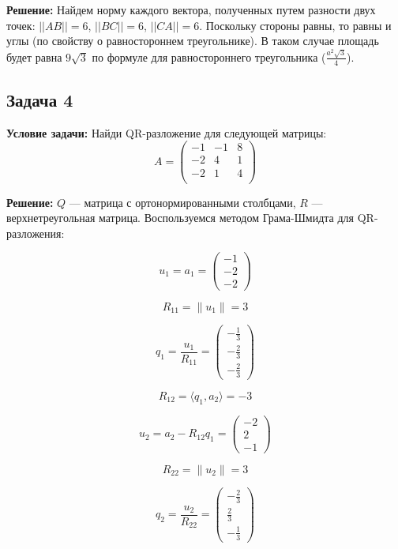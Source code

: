 \documentclass[a4paper,12pt]{article}
\begin{document}
\textbf{Решение:}
Найдем норму каждого вектора, полученных путем разности двух точек: $||AB|| = 6$, $||BC|| = 6$, $||CA|| = 6$. Поскольку стороны равны, то равны и углы (по свойству о равностороннем треугольнике). В таком случае площадь будет равна $9\sqrt{3}$ по формуле для равностороннего треугольника ($\frac{a^2\sqrt{3}}{4}$).

\vspace{1cm}

\subsection{Задача 4}
\textbf{Условие задачи:} Найди QR-разложение для следующей матрицы:
\[
A = \begin{pmatrix}
-1 & -1 & 8 \\
-2 & 4 & 1 \\
-2 & 1 & 4 \\
\end{pmatrix}
\]

\textbf{Решение:}
$Q$ — матрица с ортонормированными столбцами, $R$ — верхнетреугольная матрица. Воспользуемся методом Грама-Шмидта для QR-разложения:

\[
u_1 = a_1 = \begin{pmatrix}
-1 \\ -2 \\ -2
\end{pmatrix}
\]

\[
R_{11} = \|u_1\| = 3
\]

\[
q_1 = \frac{u_1}{R_{11}} = \begin{pmatrix}
-\frac{1}{3} \\
-\frac{2}{3} \\
-\frac{2}{3}
\end{pmatrix}
\]

\[
R_{12} = \langle q_1, a_2 \rangle = -3
\]

\[
u_2 = a_2 - R_{12} q_1 = \begin{pmatrix}
-2 \\ 2 \\ -1
\end{pmatrix}
\]

\[
R_{22} = \|u_2\| = 3
\]

\[
q_2 = \frac{u_2}{R_{22}} = \begin{pmatrix}
-\frac{2}{3} \\ \frac{2}{3} \\ -\frac{1}{3}
\end{pmatrix}
\]
\end{document}
